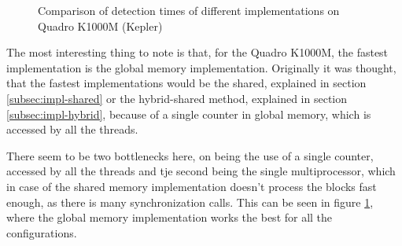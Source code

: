 \begin{figure}[ht]
\centering{}
	\caption{Comparison of detection times of different implementations on Quadro K1000M (Kepler)}
	\label{fig:quadro-det-measurement}
\end{figure}

The most interesting thing to note is that, for the Quadro K1000M, the fastest implementation is the global memory implementation. Originally it was thought, that the fastest implementations would be the shared, explained in section \ref{subsec:impl-shared} or the hybrid-shared method, explained in section \ref{subsec:impl-hybrid}, because of a single counter in global memory, which is accessed by all the threads.

There seem to be two bottlenecks here, on being the use of a single counter, accessed by all the threads and tje second being the single multiprocessor, which in case of the shared memory implementation doesn't process the blocks fast enough, as there is many synchronization calls. This can be seen in figure \ref{fig:quadro-det-measurement}, where the global memory implementation works the best for all the configurations.

